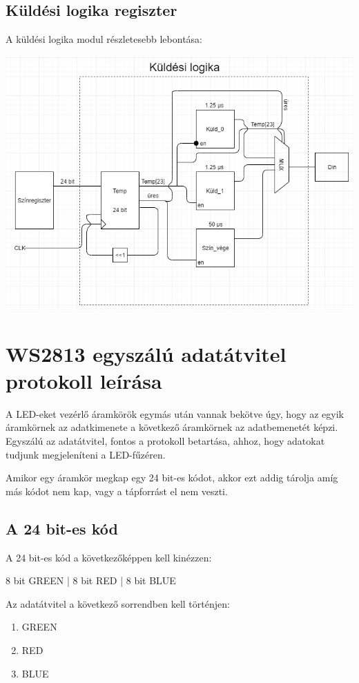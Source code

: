 \documentclass[10pt]{article} %
\begin{document}
\subsection{Küldési logika regiszter}

\noindent A küldési logika modul részletesebb lebontása: 

\includegraphics[scale=0.6]{kuldesi_logika.png}


\section{WS2813 egyszálú adatátvitel protokoll leírása}

\indent A LED-eket vezérlő áramkörök egymás után vannak bekötve úgy, hogy az egyik áramkörnek az adatkimenete a következő áramkörnek az adatbemenetét képzi. Egyszálú az adatátvitel, fontos a protokoll betartása, ahhoz, hogy adatokat tudjunk megjeleníteni a LED-fűzéren.

Amikor egy áramkör megkap egy 24 bit-es kódot, akkor ezt addig tárolja amíg más kódot nem kap, vagy a tápforrást el nem veszti.

\subsection{A 24 bit-es kód}

A 24 bit-es kód a következőképpen kell kinézzen:

8 bit GREEN | 8 bit RED | 8 bit BLUE

Az adatátvitel a következő sorrendben kell történjen: 
\begin{enumerate}
	\item GREEN
	\item RED
	\item BLUE
\end{enumerate}
\end{document}

